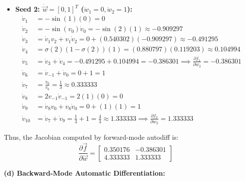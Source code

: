 \documentclass[11pt,english]{article}
\begin{document}
\begin{enumerate}[resume]
\begin{itemize}
    \item \textbf{Seed 2: $\dot{\vec{w}} = [0, 1]^T$ ($\dot{w}_1 = 0, \dot{w}_2 = 1$):}
    \begin{align*}
        \dot{v}_1 &= -\sin(1)(0) = 0 \\
        \dot{v}_2 &= -\sin(v_0)\dot{v}_0 = -\sin(2)(1) \approx -0.909297 \\
        \dot{v}_3 &= \dot{v}_1 v_2 + v_1 \dot{v}_2 = 0 + (0.540302)(-0.909297) \approx -0.491295 \\
        \dot{v}_4 &= \sigma(2)(1-\sigma(2))(1) = (0.880797)(0.119203) \approx 0.104994 \\
        \dot{v}_5 &= \dot{v}_3 + \dot{v}_4 = -0.491295 + 0.104994 = -0.386301 \implies \frac{\partial f_1}{\partial w_2} = -0.386301 \\
        \dot{v}_6 &= \dot{v}_{-1} + \dot{v}_0 = 0 + 1 = 1 \\
        \dot{v}_7 &= \frac{\dot{v}_6}{v_6} = \frac{1}{3} \approx 0.333333 \\
        \dot{v}_8 &= 2 v_{-1} \dot{v}_{-1} = 2(1)(0) = 0 \\
        \dot{v}_9 &= \dot{v}_8 v_0 + v_8 \dot{v}_0 = 0 + (1)(1) = 1 \\
        \dot{v}_{10} &= \dot{v}_7 + \dot{v}_9 = \frac{1}{3} + 1 = \frac{4}{3} \approx 1.333333 \implies \frac{\partial f_2}{\partial w_2} = 1.333333
    \end{align*}
\end{itemize}
Thus, the Jacobian computed by forward-mode autodiff is:
\begin{equation}
    \frac{\partial \vec{f}}{\partial \vec{w}} = \begin{bmatrix} 0.350176 & -0.386301 \\ 4.333333 & 1.333333 \end{bmatrix}
\end{equation}

\vspace{0.5em}
\textbf{(d) Backward-Mode Automatic Differentiation:}


\end{enumerate}
\end{document}
